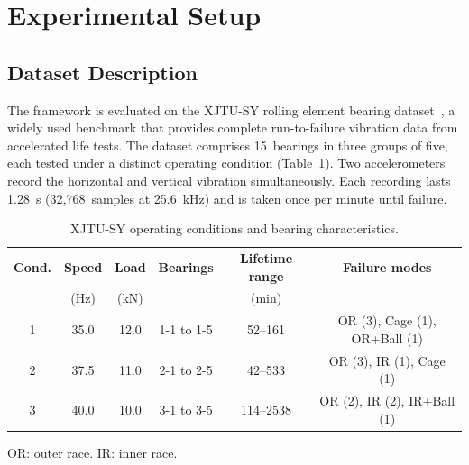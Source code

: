 
\section{Experimental Setup}
\label{sec:experimental_setup}

\subsection{Dataset Description}
\label{sec:dataset}

The framework is evaluated on the XJTU-SY rolling element bearing
dataset~\cite{8576668, lei2019xjtusy}, a widely used benchmark that
provides complete run-to-failure vibration data from accelerated life
tests. The dataset comprises 15~bearings in three groups of five, each
tested under a distinct operating condition
(Table~\ref{tab:xjtu_conditions}). Two accelerometers record the
horizontal and vertical vibration simultaneously. Each recording lasts
1.28~s (32,768~samples at 25.6~kHz) and is taken once per minute until
failure.

\begin{table}[htbp]
\centering
\caption{XJTU-SY operating conditions and bearing characteristics.}
\label{tab:xjtu_conditions}
\footnotesize
\renewcommand{\arraystretch}{1.2}
\begin{tabular}{cccccc}
\toprule
\textbf{Cond.} & \textbf{Speed} & \textbf{Load} &
\textbf{Bearings} & \textbf{Lifetime range} &
\textbf{Failure modes} \\
& (Hz) & (kN) & & (min) & \\
\midrule
1 & 35.0  & 12.0 & 1-1 to 1-5 & 52--161 &
  OR (3), Cage (1), OR+Ball (1) \\
2 & 37.5  & 11.0 & 2-1 to 2-5 & 42--533 &
  OR (3), IR (1), Cage (1) \\
3 & 40.0  & 10.0 & 3-1 to 3-5 & 114--2538 &
  OR (2), IR (2), IR+Ball (1) \\
\bottomrule
\end{tabular}

\vspace{2pt}
\raggedright\scriptsize OR: outer race. IR: inner race.
\end{table}

